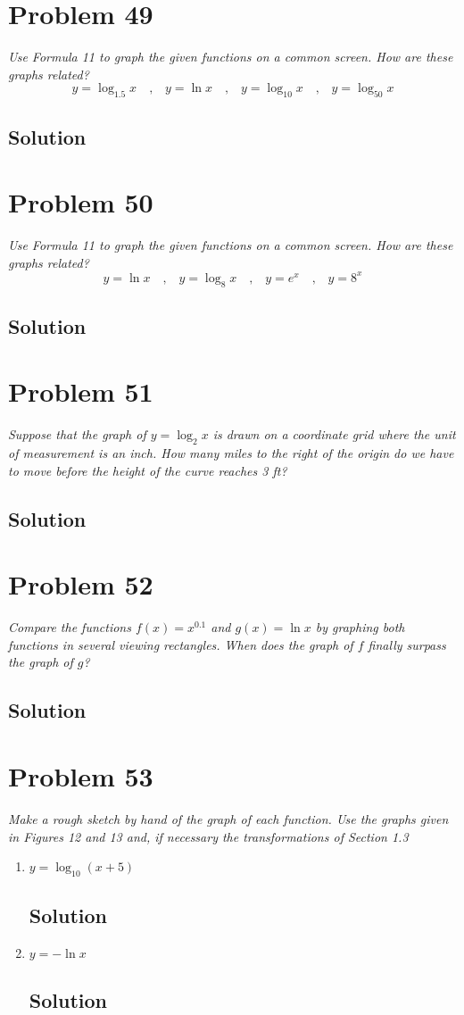 \documentclass[11pt]{article}
\newcommand{\soln}{\subsection*}
\newcommand{\qn}{\textit}
\newcommand{\eqtext}[1]{\quad\text{#1}\quad}
\begin{document}
\section*{Problem 49}

\qn{Use Formula 11 to graph the given functions on a common screen. How are these graphs related? $$y=\log_{1.5}x \eqtext{,} y=\ln{x} \eqtext{,} y=\log_{10}x \eqtext{,} y=\log_{50}x$$}

\soln{Solution}

\section*{Problem 50}

\qn{Use Formula 11 to graph the given functions on a common screen. How are these graphs related? $$y=\ln{x} \eqtext{,} y=\log_8{x} \eqtext{,} y=e^x \eqtext{,} y=8^x$$}

\soln{Solution}

\section*{Problem 51}

\qn{Suppose that the graph of $y=\log_2{x}$ is drawn on a coordinate grid where the unit of measurement is an inch. How many miles to the right of the origin do we have to move before the height of the curve reaches 3 ft?}

\soln{Solution}

\section*{Problem 52}

\qn{Compare the functions $f(x)=x^{0.1}$ and $g(x)=\ln{x}$ by graphing both functions in several viewing rectangles. When does the graph of $f$ finally surpass the graph of $g$?}

\soln{Solution}

\section*{Problem 53}

\qn{Make a rough sketch by hand of the graph of each function. Use the graphs given in Figures 12 and 13 and, if necessary the transformations of Section 1.3}
\begin{enumerate}
	\item \qn{$y=\log_{10}(x+5)$}
	\soln{Solution}
	
	\item \qn{$y=-\ln{x}$}
	\soln{Solution}
\end{enumerate}
\end{document}
